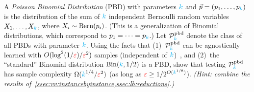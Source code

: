 \begin{question}\label{ex:testing:pbd}
  A \emph{Poisson Binomial Distribution} (PBD) with parameters ${\textcolor{cyan}{k}}$ and $\vec{p}=(p_1,\dots,p_{\textcolor{cyan}{k}})$ is the distribution of the sum of ${\textcolor{cyan}{k}}$ independent Bernoulli random variables $X_1,\dots,X_{\textcolor{cyan}{k}}$, where $X_i \sim \operatorname{Bern}( p_i ) $. (This is a generalization of Binomial distributions, which correspond to $p_1=\dots=p_{\textcolor{cyan}{k}}$.) Let $\mathcal{P}^{\rm{}pbd}_{{\textcolor{cyan}{k}}}$ denote the class of all PBDs with parameter ${\textcolor{cyan}{k}}$. Using the facts that (1)~$\mathcal{P}^{\rm{}pbd}_{{\textcolor{cyan}{k}}}$ can be agnostically learned with $O(\log^2(1/\textcolor{red}{\varepsilon})/\textcolor{red}{\varepsilon}^2)$ samples (independent of ${\textcolor{cyan}{k}}$)~\citep{DDS:PBD:15}, and (2)~the ``standard'' Binomial distribution $\binomial{\ab}{1/2}$ is a PBD, show that testing $\mathcal{P}^{\rm{}pbd}_{{\textcolor{cyan}{k}}}$ has sample complexity $\Omega({\textcolor{cyan}{k}}^{1/4}/\textcolor{red}{\varepsilon}^2)$ (as long as $\textcolor{red}{\varepsilon} \geq 1/2^{O({\textcolor{cyan}{k}}^{1/8})}$). \textit{(Hint: combine the results of~\cref{ssec:vv:instancebyinstance,ssec:lb:reductions}.)}
\end{question}